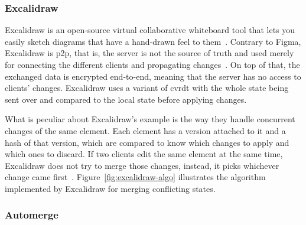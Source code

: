 
\subsubsection{Excalidraw}


Excalidraw is an open-source virtual collaborative whiteboard tool that lets you easily sketch diagrams that have a hand-drawn feel to them~\autocite{noauthor_rethinking_nodate}.
Contrary to Figma, Excalidraw is \acrfull{p2p}, that is, the server is not the source of truth and used merely for connecting the different clients and propagating changes~\autocite{noauthor_building_nodate}.
On top of that, the exchanged data is encrypted end-to-end, meaning that the server has no access to clients' changes.
Excalidraw uses a variant of \acrfull{cvrdt} with the whole state being sent over and compared to the local state before applying changes.


What is peculiar about Excalidraw's example is the way they handle concurrent changes of the same element. Each element has a version attached to it and a hash of that version, which are compared to know which changes to apply and which ones to discard. If two clients edit the same element at the same time, Excalidraw does not try to merge those changes, instead, it picks whichever change came first~\autocite{noauthor_building_nodate}.
Figure~\ref{fig:excalidraw-algo} illustrates the algorithm implemented by Excalidraw for merging conflicting states.


\subsubsection{Automerge}


